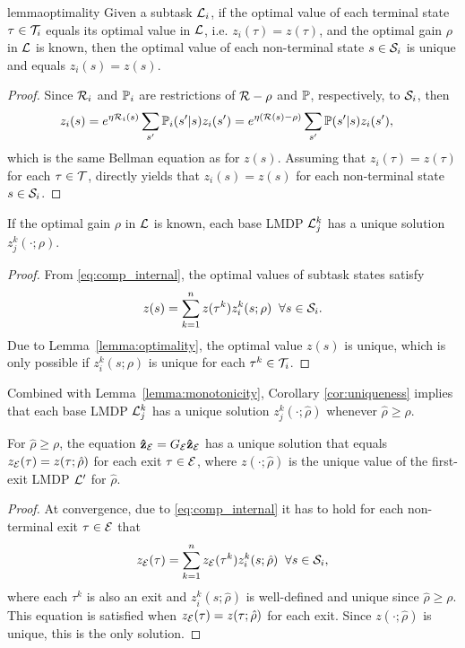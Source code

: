 \begin{restatable}{lemma}{optimality}
Given a subtask $\mathcal{L}_i$, if the optimal value of each terminal state $\tau\in\mathcal{T}_i$ equals its optimal value in $\mathcal{L}$, i.e. $z_i(\tau) = z(\tau)$, and the optimal gain $\rho$ in $\mathcal{L}$ is known, then the optimal value of each non-terminal state $s\in\mathcal{S}_i$ is unique and equals $z_i(s)=z(s)$.
    \label{lemma:optimality}
\end{restatable}

\begin{proof} Since $\mathcal{R}_i$ and $\mathbb{P}_i$ are restrictions of $\mathcal{R}-\rho$ and $\mathbb{P}$, respectively, to $\mathcal{S}_i$, then
\begin{align*}
    z_i(s) &= e^{\eta\mathcal{R}_i(s)}\sum_{s'}\mathbb{P}_i(s'\lvert s) z_i(s') = e^{\eta(\mathcal{R}(s) - \rho)}\sum_{s'}\mathbb{P}(s'\lvert s) z_i(s'), \nonumber
\end{align*}
which is the same Bellman equation as for $z(s)$. Assuming that $z_i(\tau) = z(\tau)$ for each $\tau\in\mathcal{T}$, directly yields that $z_i(s)=z(s)$ for each non-terminal state $s\in\mathcal{S}_i$.
\end{proof}

\begin{corollary}\label{cor:uniqueness}
    If the optimal gain $\rho$ in $\mathcal{L}$ is known, each base LMDP $\mathcal{L}_j^k$ has a unique solution $z_j^k(\cdot;\rho)$.
\end{corollary}

\begin{proof} From \eqref{eq:comp_internal}, the optimal values of subtask states satisfy
\[
  z(s) = \sum_{k=1}^n z(\tau^k) z_i^k(s;\rho)\;\;\forall s\in\mathcal{S}_i.
\]
Due to Lemma~\ref{lemma:optimality}, the optimal value $z(s)$ is unique, which is only possible if $z_i^k(s;\rho)$ is unique for each $\tau^k\in\mathcal{T}_i$.
\end{proof}

Combined with Lemma~\ref{lemma:monotonicity}, Corollary \ref{cor:uniqueness} implies that each base LMDP $\mathcal{L}_j^k$ has a unique solution $z_j^k(\cdot;\hat\rho)$ whenever $\hat\rho\geq\rho$.

\begin{lemma}
For $\hat\rho\geq\rho$, the equation ${\bf \hat z_{\mathcal{E}}} = G_{\mathcal{E}} {\bf\hat z_{\mathcal{E}}}$ has a unique solution that equals $z_{\mathcal{E}}(\tau)=z(\tau;\hat\rho)$ for each exit $\tau\in\mathcal{E}$, where $z(\cdot;\hat\rho)$ is the unique value of the first-exit LMDP $\mathcal{L}'$ for $\hat\rho$.
\end{lemma}

\begin{proof}
At convergence, due to \eqref{eq:comp_internal} it has to hold for each non-terminal exit $\tau\in\mathcal{E}$ that
\[
  z_{\mathcal{E}}(\tau) = \sum_{k=1}^n z_{\mathcal{E}}(\tau^k) z_i^k(s;\hat\rho)\;\;\forall s\in\mathcal{S}_i,
\]
where each $\tau^k$ is also an exit and $z_i^k(s;\hat\rho)$ is well-defined and unique since $\hat\rho\geq\rho$. This equation is satisfied when $z_{\mathcal{E}}(\tau)=z(\tau;\hat\rho)$ for each exit. Since $z(\cdot;\hat\rho)$ is unique, this is the only solution.
\end{proof}

